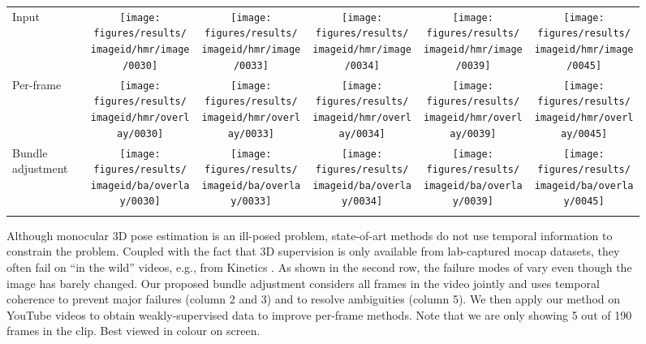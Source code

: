\documentclass[10pt,twocolumn,letterpaper]{article}
\begin{document}
\begin{figure*}[t]

\def \imwidth {0.17\linewidth}
\def \imageid {369fccd180fe16bd_151_161}

\vspace{-\baselineskip}
\hspace*{-0.5cm}
\begin{tabular}{ m{1cm} ccccc}
Input                                                       &   
	\texttt{[image: figures/results/\\imageid/hmr/image/0030]} & 
	\texttt{[image: figures/results/\\imageid/hmr/image/0033]} & 
	\texttt{[image: figures/results/\\imageid/hmr/image/0034]} & 
	\texttt{[image: figures/results/\\imageid/hmr/image/0039]} &
	\texttt{[image: figures/results/\\imageid/hmr/image/0045]} \\ \addlinespace[0.1cm]
Per-frame \cite{kanazawa_cvpr_2018}  &
	\texttt{[image: figures/results/\\imageid/hmr/overlay/0030]} & 
	\texttt{[image: figures/results/\\imageid/hmr/overlay/0033]} & 
	\texttt{[image: figures/results/\\imageid/hmr/overlay/0034]} & 
	\texttt{[image: figures/results/\\imageid/hmr/overlay/0039]} &
	\texttt{[image: figures/results/\\imageid/hmr/overlay/0045]} \\ \addlinespace[0.1cm]
Bundle adjustment &
	\texttt{[image: figures/results/\\imageid/ba/overlay/0030]} &
	\texttt{[image: figures/results/\\imageid/ba/overlay/0033]} & 
	\texttt{[image: figures/results/\\imageid/ba/overlay/0034]} & 
	\texttt{[image: figures/results/\\imageid/ba/overlay/0039]} &
	\texttt{[image: figures/results/\\imageid/ba/overlay/0045]} \\
& \multicolumn{5}{l}{

}
\end{tabular}
\caption{
Although monocular 3D pose estimation is an ill-posed problem, state-of-art methods \cite{kanazawa_cvpr_2018} do not use temporal information to constrain the problem.
Coupled with the fact that 3D supervision is only available from lab-captured mocap datasets, they often fail on ``in the wild'' videos, e.g., from Kinetics \cite{kay_arxiv_2017}.
As shown in the second row, the failure modes of \cite{kanazawa_cvpr_2018} vary even though the image has barely changed.
Our proposed bundle adjustment considers all frames in the video jointly and uses temporal coherence to prevent major failures (column 2 and 3) and to resolve ambiguities (column 5).
We then apply our method on YouTube videos to obtain weakly-supervised data to improve per-frame methods. Note that we are only showing 5 out of 190 frames in the clip.
Best viewed in colour on screen.
}
\label{fig:teaser}
\vspace{-0.5\baselineskip}
\end{figure*}
\end{document}
